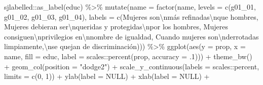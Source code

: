 \documentclass[
  12pt,
]{book}
\newenvironment{Shaded}{\begin{snugshade}}{\end{snugshade}}
\newcommand{\AttributeTok}[1]{\textcolor[rgb]{0.77,0.63,0.00}{#1}}
\newcommand{\ConstantTok}[1]{\textcolor[rgb]{0.00,0.00,0.00}{#1}}
\newcommand{\DecValTok}[1]{\textcolor[rgb]{0.00,0.00,0.81}{#1}}
\newcommand{\FunctionTok}[1]{\textcolor[rgb]{0.00,0.00,0.00}{#1}}
\newcommand{\NormalTok}[1]{#1}
\newcommand{\SpecialCharTok}[1]{\textcolor[rgb]{0.00,0.00,0.00}{#1}}
\newcommand{\StringTok}[1]{\textcolor[rgb]{0.31,0.60,0.02}{#1}}
\begin{document}
\begin{Shaded}
\begin{Highlighting}[]
\NormalTok{  sjlabelled}\SpecialCharTok{::}\FunctionTok{as\_label}\NormalTok{(educ) }\SpecialCharTok{\%\textgreater{}\%} 
  \FunctionTok{mutate}\NormalTok{(}\AttributeTok{name =} \FunctionTok{factor}\NormalTok{(name,}
                       \AttributeTok{levels =} \FunctionTok{c}\NormalTok{(}\StringTok{\textquotesingle{}g01\_01\textquotesingle{}}\NormalTok{, }\StringTok{\textquotesingle{}g01\_02\textquotesingle{}}\NormalTok{, }\StringTok{\textquotesingle{}g01\_03\textquotesingle{}}\NormalTok{, }\StringTok{\textquotesingle{}g01\_04\textquotesingle{}}\NormalTok{),}
                       \AttributeTok{labels =} \FunctionTok{c}\NormalTok{(}\StringTok{\textquotesingle{}Mujeres son}\SpecialCharTok{\textbackslash{}n}\StringTok{más refinadas}\SpecialCharTok{\textbackslash{}n}\StringTok{que hombres\textquotesingle{}}\NormalTok{,}
                     \StringTok{\textquotesingle{}Mujeres debieran ser}\SpecialCharTok{\textbackslash{}n}\StringTok{queridas y protegidas}\SpecialCharTok{\textbackslash{}n}\StringTok{por los hombres\textquotesingle{}}\NormalTok{,}
                     \StringTok{\textquotesingle{}Mujeres consiguen}\SpecialCharTok{\textbackslash{}n}\StringTok{privilegios en}\SpecialCharTok{\textbackslash{}n}\StringTok{nombre de igualdad\textquotesingle{}}\NormalTok{,}
                     \StringTok{\textquotesingle{}Cuando mujeres son}\SpecialCharTok{\textbackslash{}n}\StringTok{derrotadas limpiamente,}\SpecialCharTok{\textbackslash{}n}\StringTok{se quejan de discriminación\textquotesingle{}}\NormalTok{))) }\SpecialCharTok{\%\textgreater{}\%}
  \FunctionTok{ggplot}\NormalTok{(}\FunctionTok{aes}\NormalTok{(}\AttributeTok{y =}\NormalTok{ prop, }\AttributeTok{x =}\NormalTok{ name, }\AttributeTok{fill =}\NormalTok{ educ, }
             \AttributeTok{label =}\NormalTok{ scales}\SpecialCharTok{::}\FunctionTok{percent}\NormalTok{(prop, }\AttributeTok{accuracy =}\NormalTok{ .}\DecValTok{1}\NormalTok{))) }\SpecialCharTok{+}
  \FunctionTok{theme\_bw}\NormalTok{() }\SpecialCharTok{+} 
  \FunctionTok{geom\_col}\NormalTok{(}\AttributeTok{position =} \StringTok{"dodge2"}\NormalTok{) }\SpecialCharTok{+}
  \FunctionTok{scale\_y\_continuous}\NormalTok{(}\AttributeTok{labels =}\NormalTok{ scales}\SpecialCharTok{::}\NormalTok{percent,}
                     \AttributeTok{limits =} \FunctionTok{c}\NormalTok{(}\DecValTok{0}\NormalTok{, }\DecValTok{1}\NormalTok{)) }\SpecialCharTok{+}
  \FunctionTok{ylab}\NormalTok{(}\AttributeTok{label =} \ConstantTok{NULL}\NormalTok{) }\SpecialCharTok{+}
  \FunctionTok{xlab}\NormalTok{(}\AttributeTok{label =} \ConstantTok{NULL}\NormalTok{) }\SpecialCharTok{+}

\end{Highlighting}
\end{Shaded}
\end{document}

